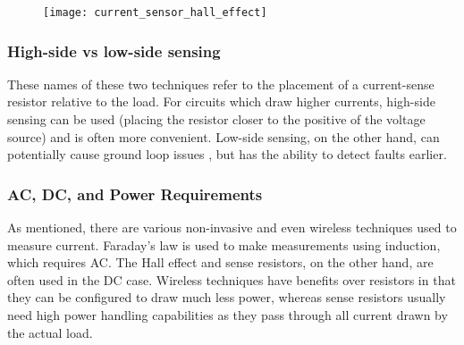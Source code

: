 \begin{figure}[h!]
    \centering
    \texttt{[image: current\_sensor\_hall\_effect]}
    \label{fig:hall-effect}
  \end{figure}

\subsubsection{High-side vs low-side sensing}\label{sec:cur_highlow}
These names of these two techniques refer to the placement of a current-sense resistor relative to the load. For circuits which draw higher currents, high-side sensing can be used
(placing the resistor closer to the positive of the voltage source) and is often more convenient. Low-side sensing, on the other hand, can potentially cause ground loop
issues \cite{WebsiteAllAboutCircuits}, but has the ability to detect faults earlier.

\subsubsection{AC, DC, and Power Requirements}\label{sec:cur_acdc}
As mentioned, there are various non-invasive and even wireless techniques used to measure current. Faraday's law is used to make measurements using induction, which requires AC.
The Hall effect and sense resistors, on the other hand, are often used in the DC case. Wireless techniques have benefits over resistors in that they can be configured to draw much less power,
whereas sense resistors usually need high power handling capabilities as they pass through all current drawn by the actual load.
